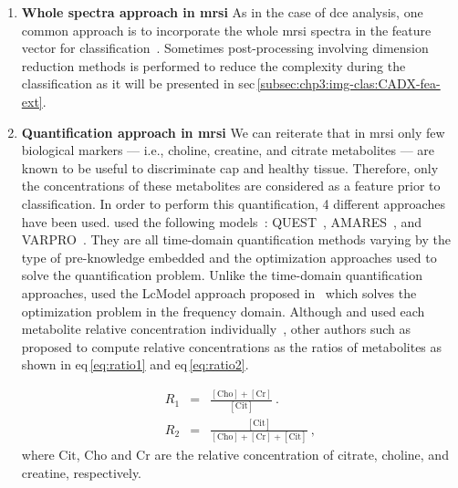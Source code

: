 \begin{enumerate}[leftmargin=*]

\item[] \textbf{Whole spectra approach in \acs*{mrsi}}
As in the case of \ac{dce} analysis, one common approach is to incorporate the
whole \ac{mrsi} spectra in the feature vector for
classification~\cite{Kelm2007,Parfait2012,Tiwari2007,Tiwari2009,Tiwari2013,Tiwari2009a,Tiwari2010,Viswanath2008a,Matulewicz2013,trigui2016classification,trigui2017automatic,
Lemaitre2016thesis}.
Sometimes post-processing involving dimension reduction methods is performed to
reduce the complexity during the classification as it will be presented in
\acs{sec}\,\ref{subsec:chp3:img-clas:CADX-fea-ext}.

\item[] \textbf{Quantification approach in \acs*{mrsi}}
We can reiterate that in \ac{mrsi} only few biological markers --- i.e.,
choline, creatine, and citrate metabolites --- are known to be useful to
discriminate \ac{cap} and healthy tissue.
Therefore, only the concentrations of these metabolites are considered as a
feature prior to classification.
In order to perform this quantification, 4 different approaches have been used.
\citeauthor{Kelm2007} used the following models~\cite{Kelm2007}:
QUEST~\cite{Ratiney2005}, AMARES~\cite{Vanhamme1997}, and
VARPRO~\cite{Coleman1993}.
They are all time-domain quantification methods varying by the type of
pre-knowledge embedded and the optimization approaches used to solve the
quantification problem.
Unlike the time-domain quantification approaches, \citeauthor{Parfait2012} used
the LcModel approach proposed in~\cite{Provencher1993} which solves the
optimization problem in the frequency domain.
Although \citeauthor{Parfait2012} and \citeauthor{Lemaitre2016thesis} used each metabolite relative concentration
individually~\cite{Parfait2012,Lemaitre2016thesis}, other authors such as \citeauthor{Kelm2007}
proposed to compute relative concentrations as the ratios of metabolites as
shown in \acs{eq}\,\ref{eq:ratio1} and \acs{eq}\,\ref{eq:ratio2}.

\begin{eqnarray}
  R_1 & = & \frac{ [ \text{Cho} ] + [ \text{Cr} ]}{[ \text{Cit} ]} \ . \label{eq:ratio1} \\
  R_2 & = & \frac{[ \text{Cit} ]}{[\text{Cho}]+[\text{Cr}]+[\text{Cit}]} \ , \label{eq:ratio2}
\end{eqnarray}
\noindent where $\text{Cit}$, $\text{Cho}$ and $\text{Cr}$ are the relative
concentration of citrate, choline, and creatine, respectively.


\end{enumerate}
